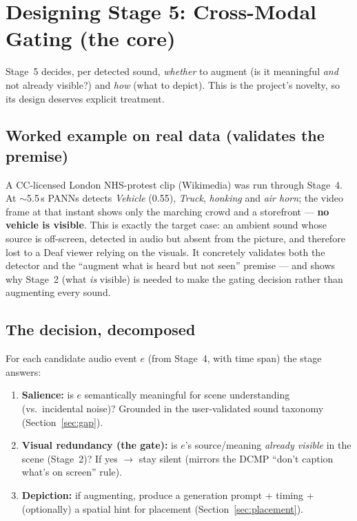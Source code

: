 \documentclass[11pt,a4paper]{article}
\begin{document}
\section{Designing Stage 5: Cross-Modal Gating (the core)}\label{sec:stage5}
Stage~5 decides, per detected sound, \emph{whether} to augment (is it meaningful \emph{and} not
already visible?) and \emph{how} (what to depict). This is the project's novelty, so its design
deserves explicit treatment.

\subsection{Worked example on real data (validates the premise)}\label{sec:stage5example}
A CC-licensed London NHS-protest clip (Wikimedia) was run through Stage~4. At $\sim$5.5\,s PANNs
detects \emph{Vehicle} (0.55), \emph{Truck}, \emph{honking} and \emph{air horn}; the video frame at
that instant shows only the marching crowd and a storefront --- \textbf{no vehicle is visible}. This
is exactly the target case: an ambient sound whose source is off-screen, detected in audio but absent
from the picture, and therefore lost to a Deaf viewer relying on the visuals. It concretely validates
both the detector and the ``augment what is heard but not seen'' premise --- and shows why Stage~2
(what \emph{is} visible) is needed to make the gating decision rather than augmenting every sound.

\subsection{The decision, decomposed}
For each candidate audio event $e$ (from Stage~4, with time span) the stage answers:
\begin{enumerate}
  \item \textbf{Salience:} is $e$ semantically meaningful for scene understanding (vs.\ incidental
    noise)? Grounded in the user-validated sound taxonomy (Section~\ref{sec:gap}).
  \item \textbf{Visual redundancy (the gate):} is $e$'s source/meaning \emph{already visible} in the
    scene (Stage~2)? If yes $\rightarrow$ stay silent (mirrors the DCMP ``don't caption what's on
    screen'' rule).
  \item \textbf{Depiction:} if augmenting, produce a generation prompt + timing + (optionally) a
    spatial hint for placement (Section~\ref{sec:placement}).
\end{enumerate}
\end{document}
